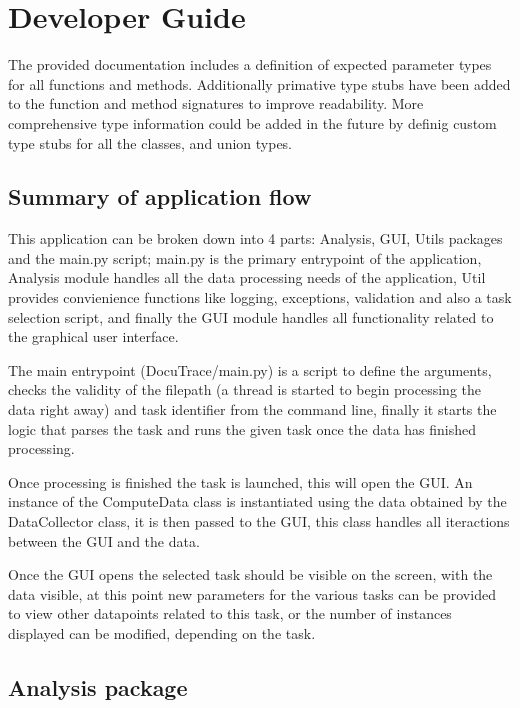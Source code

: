 \documentclass[11pt]{article}
\begin{document}
\section{Developer Guide}

The provided documentation includes a definition of expected parameter types for all functions and methods. 
Additionally primative type stubs have been added to the function and method signatures to improve readability.
More comprehensive type information could be added in the future by definig custom type stubs for all the classes, and union types.


\subsection{Summary of application flow}
This application can be broken down into 4 parts: Analysis, GUI, Utils packages and the main.py script; 
main.py is the primary entrypoint of the application, Analysis module handles all the data processing needs of the application, Util provides convienience functions like logging, exceptions, validation and also a task selection script, and finally the GUI module handles all functionality related to the graphical user interface. 

The main entrypoint (DocuTrace/main.py) is a script to define the arguments, checks the validity of the filepath (a thread is started to begin processing the data right away) and task identifier from the command line, finally it starts the logic that parses the task and runs the given task once the data has finished processing.

Once processing is finished the task is launched, this will open the GUI. 
An instance of the ComputeData class is instantiated using the data obtained by the DataCollector class, it is then passed to the GUI, this class handles all iteractions between the GUI and the data.

Once the GUI opens the selected task should be visible on the screen, with the data visible, at this point new parameters for the various tasks can be provided to view other datapoints related to this task, or the number of instances displayed can be modified, depending on the task.

\subsection{Analysis package}
\end{document}
